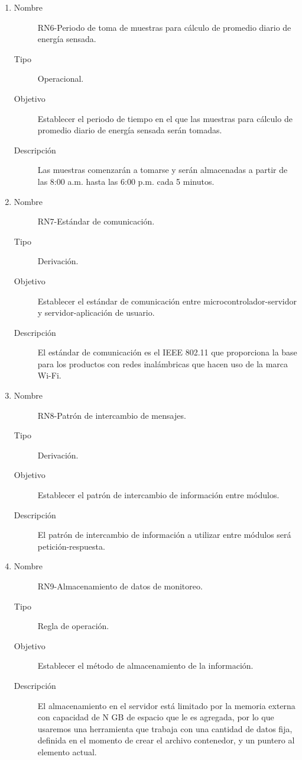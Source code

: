 \begin{enumerate}[label=RN\arabic*.]
\item \label{RN6}
		\begin{description}
			\item[Nombre] RN6-Periodo de toma de muestras para cálculo de promedio diario de energía sensada.
			\item[Tipo] Operacional.
			\item[Objetivo] Establecer el periodo de tiempo en el que las muestras para cálculo de promedio diario de energía sensada serán tomadas.
			\item[Descripción] Las muestras comenzarán a tomarse y serán almacenadas a partir de las 8:00 a.m. hasta las 6:00 p.m. cada 5 minutos.
		\end{description}
		
\item \label{RN7}
		\begin{description}
			\item[Nombre] RN7-Estándar de comunicación.
			\item[Tipo] Derivación.
			\item[Objetivo] Establecer el estándar de comunicación entre microcontrolador-servidor y servidor-aplicación de usuario.
			\item[Descripción] El estándar de comunicación es el IEEE 802.11 que proporciona la base para los productos con redes inalámbricas que hacen uso de la marca Wi-Fi.
		\end{description}
		
\item \label{RN8}
		\begin{description}
			\item[Nombre] RN8-Patrón de intercambio de mensajes.
			\item[Tipo] Derivación.
			\item[Objetivo] Establecer el patrón de intercambio de información entre módulos.
			\item[Descripción] El patrón de intercambio de información a utilizar entre módulos será petición-respuesta.
		\end{description}
		
\item \label{RN9}
		\begin{description}
			\item[Nombre] RN9-Almacenamiento de datos de monitoreo.
			\item[Tipo] Regla de operación.
			\item[Objetivo] Establecer el método de almacenamiento de la información.
			\item[Descripción] El almacenamiento en el servidor está limitado por la memoria externa con capacidad de N GB de espacio que le es agregada, por lo que usaremos una herramienta que trabaja con una cantidad de datos fija, definida en el momento de crear el archivo contenedor, y un puntero al elemento actual.
		\end{description}


\end{enumerate}
